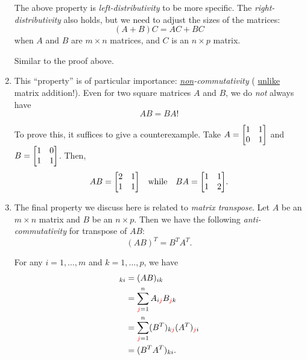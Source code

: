 \begin{enumerate}
The above property is \emph{left-distributivity} to be more specific. The
\emph{right-distributivity} also holds, but we need to adjust the sizes of the
matrices:
\[
(A+B)C=AC+BC
\]
when \(A\) and \(B\) are \(m\times n\) matrices, and \(C\) is an \(n\times p\)
matrix.

\begin{pf}
Similar to the proof above.
\end{pf}

\item \label{it:matrix-mult-noncomm}
This ``property'' is of particular importance: \emph{\underline{non}-commutativity} (\warn{}
\underline{unlike} matrix addition!). Even for two square matrices \(A\) and
\(B\), we do \emph{not} always have
\[
AB=BA!
\]
\begin{pf}
To prove this, it suffices to give a counterexample. Take \(A=\mqty[1&1\\
0&1]\) and \(B=\mqty[1&0\\ 1&1]\). Then,
\[
AB=\mqty[2&1\\ 1&1]\qqtext{while}
BA=\mqty[1&1\\ 1&2].
\]
\end{pf}

\item \label{it:matrix-prod-transpose-anticomm}
The final property we discuss here is related to \emph{matrix transpose}.
Let \(A\) be an \(m\times n\) matrix and \(B\) be an \(n\times p\). Then we
have the following \emph{anti-commutativity} for transpose of \(AB\):
\[
(AB)^{T}=B^{T}A^{T}.
\]
\begin{pf}
For any \(i=1,\dotsc,m\) and \(k=1,\dotsc,p\), we have
\begin{align*}
[(AB)^{T}]_{ki}&=(AB)_{ik}\\
&=\sum_{\rc{j}=1}^{n}A_{i\rc{j}}B_{\rc{j}k}\\
&=\sum_{\rc{j}=1}^{n}(B^T)_{k\rc{j}}(A^T)_{\rc{j}i}\\
&=(B^{T}A^{T})_{ki}.
\end{align*}
\end{pf}
\end{enumerate}
